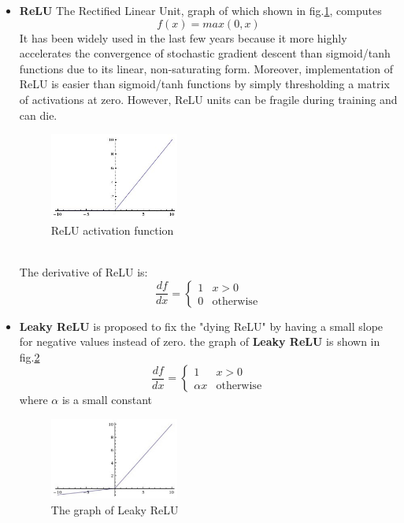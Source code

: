 \begin{itemize}
    \item \textbf{ReLU} The Rectified Linear Unit, graph of which shown in fig.\ref{fig:relu}\cite{cs231n}, computes 
    \begin{equation}
        f(x) = max(0,x)
    \end{equation}
    It has been widely used in the last few years because it more highly accelerates the convergence of stochastic gradient descent 
    than sigmoid/tanh functions due to its linear, non-saturating form. Moreover, implementation of ReLU is easier than sigmoid/tanh functions by simply thresholding a matrix of activations at zero. However, ReLU units can be fragile during training and can die\cite{cs231n}.
    \begin{figure}[th!]
        \centering
        \includegraphics[width=0.4\textwidth]{Chapters/Fig/relu.jpg}
        \caption{ReLU activation function}
        \label{fig:relu}
    \end{figure}\\
    The derivative of ReLU is:
    \begin{equation}
        \frac{df}{dx} = \begin{cases}
            1 & x > 0\\
            0 & \mbox{otherwise}
        \end{cases}
    \end{equation}
    \item \textbf{Leaky ReLU} is proposed to fix the "dying ReLU" by having a small slope for negative values instead of zero.\cite{cs231n} 
    the graph of \textbf{Leaky ReLU} is shown in fig.\ref{fig:lrelu}\cite{cs231n}
        \begin{equation}
        \frac{df}{dx} = \begin{cases}
            1 & x > 0\\
            \alpha x & \mbox{otherwise}
        \end{cases}
    \end{equation}
    where $\alpha$ is a small constant
    \begin{figure}[h!]
        \centering
        \includegraphics[width=0.4\textwidth]{Chapters/Fig/leaky.jpeg}
        \caption{The graph of Leaky ReLU}
        \label{fig:lrelu}
    \end{figure}
\end{itemize}

